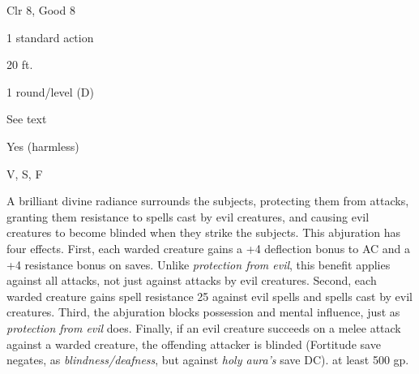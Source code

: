 
\begin{description*}
\item[Level:] Clr 8, Good 8
\item[Casting Time:] 1 standard action
\item[Range:] 20 ft.
\item[Duration:] 1 round/level (D)
\item[Saving Throw:] See text
\item[Spell Resistance:] Yes (harmless)
\item[Components:] V, S, F
\end{description*}

A brilliant divine radiance surrounds the subjects, protecting them from attacks,
granting them resistance to spells cast by evil creatures, and causing evil creatures
to become blinded when they strike the subjects. This abjuration has four effects.
First, each warded creature gains a +4 deflection bonus to AC and a +4 resistance
bonus on saves. Unlike \textit{protection from evil}, this benefit applies against
all attacks, not just against attacks by evil creatures.
Second, each warded creature gains spell resistance 25 against evil spells and
spells cast by evil creatures.
Third, the abjuration blocks possession and mental influence, just as \textit{protection
from evil} does.
Finally, if an evil creature succeeds on a melee attack against a warded creature,
the offending attacker is blinded (Fortitude save negates, as \textit{blindness/deafness},
but against \textit{holy aura's} save DC).
at least 500 gp.